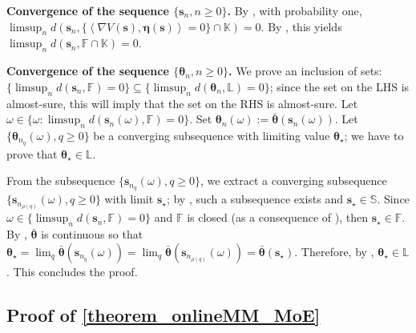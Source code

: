 \documentclass{article}
\def\eqdef{:=}
\def\param{\vtheta}
\def\barparam{\bar{\param}}
\newcommand{\pscal}[2]{\left\langle#1,#2\right\rangle} %
\def\veta{{\bm{\eta}}}
\def\vtheta{{\bm{\theta}}}
\def\vs{{\bm{s}}}
\def\sF{{\mathbb{F}}}
\def\sL{{\mathbb{L}}}
\def\sS{{\mathbb{S}}}
\begin{document}
{\bf Convergence of the sequence $\{\vs_n, n \geq 0\}$.} By \cite[Theorem 2.3]{andrieu_stability_2005},  with probability one, $\limsup_n d(\vs_n, \{\pscal{\nabla V(\vs)}{\veta(\vs)} =0 \} \cap \mathbb{K}) =0.$ By , this yields $\limsup_n d(\vs_n, \sF\cap \mathbb{K})=0$. 

{\bf Convergence of the sequence $\{\vtheta_n, n \geq 0\}$.} We prove an inclusion of sets: $\{ \limsup_n d(\vs_n, \sF) =0 \} \subseteq \{\limsup_n d(\vtheta_n, \sL)= 0\}$; since the set on the LHS is almost-sure, this will imply that the set on the RHS is almost-sure.
Let $\omega \in \{ \omega: \limsup_n d(\vs_n(\omega), \sF)=0\}$. Set $\vtheta_n(\omega) \eqdef \barparam(\vs_n(\omega))$. Let $\{\vtheta_{n_q}(\omega), q \geq 0 \}$ be a converging subsequence with limiting value $\vtheta_\star$; we have to prove that $\vtheta_\star \in \sL$.

From the subsequence $\{\vs_{n_q}(\omega),q \geq 0\}$, we extract a converging subsequence  $\{\vs_{n_{\rho(q)}}(\omega),q \geq 0\}$ with limit $\vs_\star$; by , such a subsequence exists and $\vs_\star \in \sS$. Since $\omega \in \{\limsup_n d(\vs_n, \sF) =0 \}$ and $\sF$ is closed (as a consequence of ), then $\vs_\star \in \sF$. By , $\barparam$ is continuous so that $\vtheta_\star =\lim_q \barparam(\vs_{n_q}(\omega))= \lim_q \barparam(\vs_{n_{\rho(q)}}(\omega)) = \barparam(\vs_\star)$. Therefore, by , $\vtheta_\star \in \sL$. This concludes the proof.


\subsection{Proof of \texorpdfstring{\cref{theorem_onlineMM_MoE}}{Theorem \ref*{theorem_onlineMM_MoE}}}\label{proof_theorem_onlineMM_MoE}




%
\end{document}
